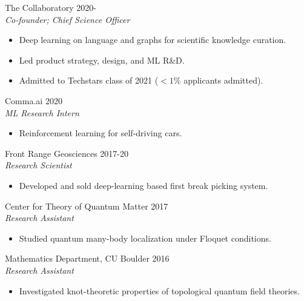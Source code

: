 \documentclass[margin]{res}
\begin{document}
\begin{resume}
                The Collaboratory \hfill 2020- \\
                 {\sl Co-founder; Chief Science Officer}
                 \begin{itemize}  \itemsep -2pt %
                 \item Deep learning on language and graphs for scientific knowledge curation.
                 \item Led product strategy, design, and ML R\&D.
                 \item Admitted to Techstars class of 2021 ($<1\%$ applicants admitted).
                 \end{itemize}

                 Comma.ai \hfill            2020 \\
		{\sl ML Research Intern}
                 \begin{itemize}  \itemsep -2pt %
                 \item Reinforcement learning for self-driving cars.
                 \end{itemize}

 
               Front Range Geosciences \hfill            2017-20 \\
                 {\sl Research Scientist}
                 \begin{itemize}  \itemsep -2pt %
                 \item Developed and sold deep-learning based first break picking system.
                 \end{itemize} 
                 Center for Theory of Quantum Matter \hfill            2017 \\
		{\sl Research Assistant}
                 \begin{itemize}  \itemsep -2pt %
                 \item Studied quantum many-body localization under Floquet conditions.
                 \end{itemize}

                Mathematics Department, CU Boulder \hfill            2016 \\
		 {\sl Research Assistant}
                 \begin{itemize}  \itemsep -2pt %
                 \item Investigated knot-theoretic properties of topological quantum field theories.
                 \end{itemize}


\end{resume}
\end{document}
